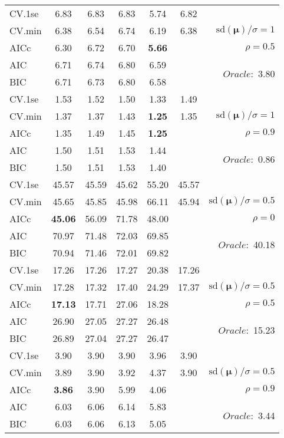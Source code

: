 \begin{table}
\begin{center}
\begin{tabular}{l*{5}{c}|r}
 \hline 
CV.1se & 6.83 & 6.83 & 6.83 & 5.74 & 6.82 & \\
CV.min & 6.38 & 6.54 & 6.74 & 6.19 & 6.38 &  $\mathrm{sd}(\mathbf{\mu})/\sigma=1$ \\
AICc & 6.30 & 6.72 & 6.70 & {\bf 5.66} & & $\rho=0.5$ \\
AIC & 6.71 & 6.74 & 6.80 & 6.59 & &  \multirow{2}{*}{$Oracle: $ 3.80} \\
BIC & 6.71 & 6.73 & 6.80 & 6.58 & &  \\
 \hline 
CV.1se & 1.53 & 1.52 & 1.50 & 1.33 & 1.49 & \\
CV.min & 1.37 & 1.37 & 1.43 & {\bf 1.25} & 1.35 &  $\mathrm{sd}(\mathbf{\mu})/\sigma=1$ \\
AICc & 1.35 & 1.49 & 1.45 & {\bf 1.25} & & $\rho=0.9$ \\
AIC & 1.50 & 1.51 & 1.53 & 1.44 & &  \multirow{2}{*}{$Oracle: $ 0.86} \\
BIC & 1.50 & 1.51 & 1.53 & 1.40 & &  \\
 \hline 
CV.1se & 45.57 & 45.59 & 45.62 & 55.20 & 45.57 & \\
CV.min & 45.65 & 45.85 & 45.98 & 66.11 & 45.94 &  $\mathrm{sd}(\mathbf{\mu})/\sigma=0.5$ \\
AICc & {\bf 45.06} & 56.09 & 71.78 & 48.00 & & $\rho=0$ \\
AIC & 70.97 & 71.48 & 72.03 & 69.85 & &  \multirow{2}{*}{$Oracle: $ 40.18} \\
BIC & 70.94 & 71.46 & 72.01 & 69.82 & &  \\
 \hline 
CV.1se & 17.26 & 17.26 & 17.27 & 20.38 & 17.26 & \\
CV.min & 17.28 & 17.32 & 17.40 & 24.29 & 17.37 &  $\mathrm{sd}(\mathbf{\mu})/\sigma=0.5$ \\
AICc & {\bf 17.13} & 17.71 & 27.06 & 18.28 & & $\rho=0.5$ \\
AIC & 26.90 & 27.05 & 27.27 & 26.48 & &  \multirow{2}{*}{$Oracle: $ 15.23} \\
BIC & 26.89 & 27.04 & 27.27 & 26.47 & &  \\
 \hline 
CV.1se & 3.90 & 3.90 & 3.90 & 3.96 & 3.90 & \\
CV.min & 3.89 & 3.90 & 3.92 & 4.37 & 3.90 &  $\mathrm{sd}(\mathbf{\mu})/\sigma=0.5$ \\
AICc & {\bf 3.86} & 3.90 & 5.99 & 4.06 & & $\rho=0.9$ \\
AIC & 6.03 & 6.06 & 6.14 & 5.83 & &  \multirow{2}{*}{$Oracle: $ 3.44} \\
BIC & 6.03 & 6.06 & 6.13 & 5.05 & &  \\
 \hline 
\end{tabular}
\end{center}
\vspace{-1cm}
\end{table}




